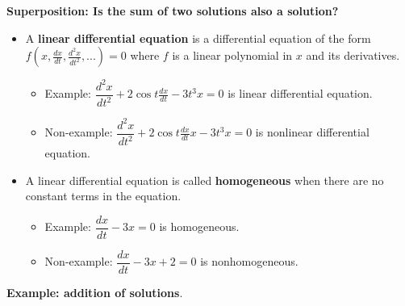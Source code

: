 \documentclass[12pt,letterpaper,noanswers]{exam}
\begin{document}



\eject



\noindent\textbf{Superposition: Is the sum of two solutions also a solution?}
\begin{tcolorbox}
\begin{itemize}
\itemsep0em
    \item A \textbf{linear differential equation} is a differential equation of the form $f(x,\frac{dx}{dt}, \frac{d^2x}{dt^2}, ...) = 0$ where $f$ is a linear polynomial in $x$ and its derivatives.
    \begin{itemize}
        \itemsep0em
        \item Example: $\dfrac{d^2x}{dt^2} + 2\cos t \frac{dx}{dt} - 3t^3 x = 0$ is linear differential equation.
   \item  Non-example: $\dfrac{d^2x}{dt^2} + 2\cos t \frac{dx}{dt}x - 3t^3 x = 0$ is nonlinear differential equation.
    \end{itemize}
    \item A linear differential equation is called \textbf{homogeneous} when there are no constant terms in the equation.  
    \begin{itemize}
    \itemsep0em
        \item Example: $\dfrac{dx}{dt} - 3x = 0$ is homogeneous. 
   \item  Non-example: $\dfrac{dx}{dt} - 3x + 2 = 0$ is nonhomogeneous.
    \end{itemize}
\end{itemize}

\end{tcolorbox}

\noindent\textbf{Example: addition of solutions}.  
\end{document}
